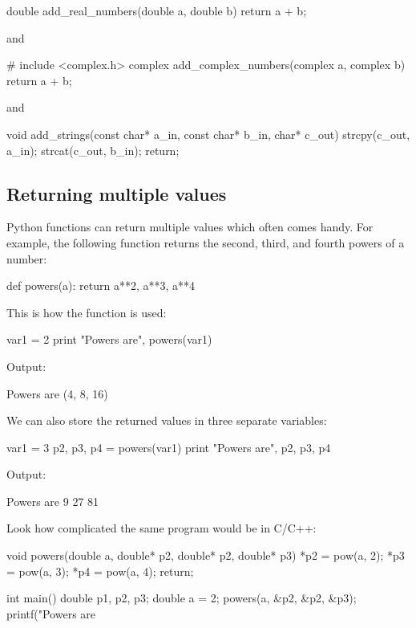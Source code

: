 \begin{bluecode}
double add_real_numbers(double a, double b)
{
  return a + b;
}
\end{bluecode}
and

\begin{bluecode}
# include <complex.h>
complex add_complex_numbers(complex a, complex b)
{
  return a + b;
}
\end{bluecode}
and 

\begin{bluecode}
void add_strings(const char* a_in, const char* b_in, char* c_out)
{
  strcpy(c_out, a_in);
  strcat(c_out, b_in);
  return;
}
\end{bluecode}

\subsection{Returning multiple values}

Python functions can return multiple values which often comes handy.
For example, the following function returns the 
second, third, and fourth powers of a number:

\begin{bluecode}
def powers(a):
    return a**2, a**3, a**4
\end{bluecode}
This is how the function is used:

\begin{bluecode}
var1 = 2
print "Powers are", powers(var1)
\end{bluecode}
Output:

\begin{greencode}
Powers are (4, 8, 16)
\end{greencode}
We can also store the returned values in three separate variables:

\begin{bluecode}
var1 = 3
p2, p3, p4 = powers(var1)
print "Powers are", p2, p3, p4
\end{bluecode}
Output:

\begin{greencode}
Powers are 9 27 81
\end{greencode}
Look how complicated the same program would be in C/C++:

\begin{bluecode}
void powers(double a, double* p2, double* p2, double* p3)
{
  *p2 = pow(a, 2);
  *p3 = pow(a, 3);
  *p4 = pow(a, 4);
  return;
}

int main()
{
  double p1, p2, p3;
  double a = 2;
  powers(a, &p2, &p2, &p3);
  printf("Powers are %
}
\end{bluecode}

